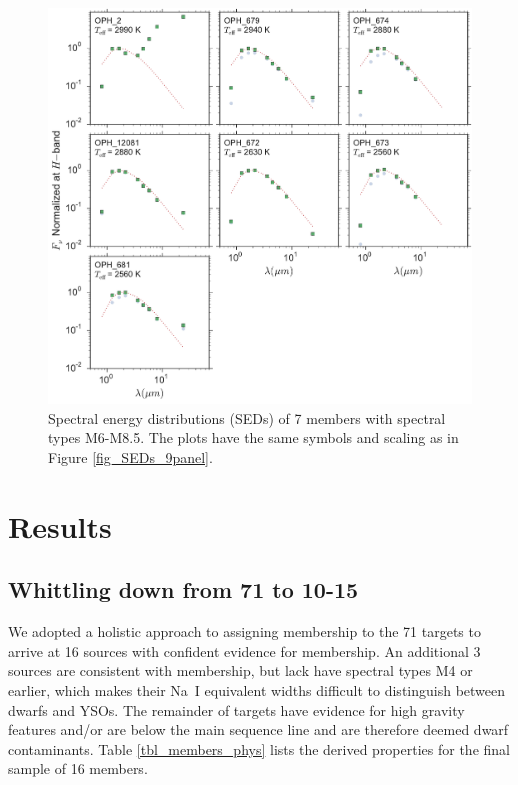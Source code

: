 \begin{figure}[ht!]
  \caption{ Spectral energy distributions (SEDs) of 7 members with spectral types M6-M8.5.  The plots have the same symbols and scaling as in Figure \ref{fig_SEDs_9panel}.  \label{fig_SEDs_7panel} }
\centering
\includegraphics[scale=0.6]{chIMACS/figures/SEDS_7panel}
\end{figure}

\section{Results}
\subsection{Whittling down from 71 to 10-15}
We adopted a holistic approach to assigning membership to the 71 targets to arrive at 16 sources with confident evidence for membership.  An additional 3 sources are consistent with membership, but lack have spectral types M4 or earlier, which makes their Na~I equivalent widths difficult to distinguish between dwarfs and YSOs.  The remainder of targets have evidence for high gravity features and/or are below the main sequence line and are therefore deemed dwarf contaminants.  Table \ref{tbl_members_phys} lists the derived properties for the final sample of 16 members.  

